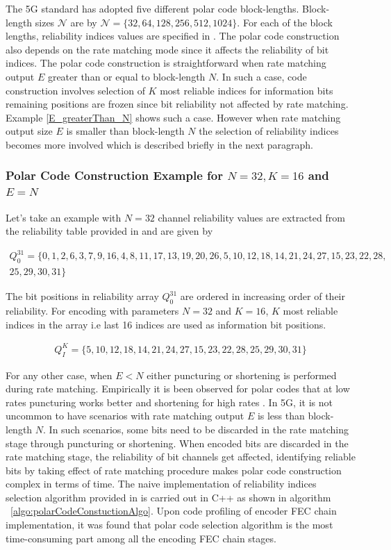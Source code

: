 The 5G standard has adopted five different polar code block-lengths. Block-length sizes $\mathcal{N}$ are by $\mathcal{N} = \{32,64,128,256,512,1024\}$.
For each of the block lengths, reliability indices values are specified in \cite{3gpp.38.212}. The polar code construction also depends on the rate matching mode since it affects the reliability of bit indices. The polar code construction is straightforward when rate matching output $E$ greater than or equal to block-length $N$. In such a case, code construction involves selection of $K$ most reliable indices for information bits remaining positions are frozen since bit reliability not affected by rate matching. Example  \ref{E_greaterThan_N} shows such a case. However when rate matching output size $E$ is smaller than block-length $N$ the selection of reliability indices becomes more involved which is described briefly in the next paragraph.

\subsubsection*{Polar Code Construction Example for $N = 32, K = 16$ and $E = N$} \label{E_greaterThan_N}
Let's take an example with $N = 32$ channel reliability values are extracted from the reliability table provided in \cite{3gpp.38.212} and are given by

\begin{eqnarray*}
Q_{0}^{31} = \{ 0, 1, 2, 6, 3, 7, 9, 16,4, 8, 11, 17, 13, 19, 20, 26, 5, 10, 12, 18, 14, 21, 24, 27, 15, 23, 22, 28,\\
25, 29, 30, 31 \}
\end{eqnarray*}

The bit positions in reliability array $Q_{0}^{31}$ are ordered in increasing order of their reliability. For encoding with parameters $N = 32$ and $K = 16$, $K$ most reliable indices in the array i.e last 16 indices are used as information bit positions. 

\begin{eqnarray*}
	Q_{\textit{I}}^{\textit{K}} =  \{5, 10, 12, 18, 14, 21, 24, 27, 15, 23, 22, 28,25, 29, 30, 31 \}
\end{eqnarray*} 

For any other case, when $E < N$ either puncturing or shortening is performed during rate matching. Empirically it is been observed for polar codes that at low rates puncturing works better and shortening for high rates \cite{lowcomplexityPuncShorteng}. In 5G, it is not uncommon to have scenarios with rate matching output $E$ is less than block-length $N$. In such scenarios, some bits need to be discarded in the rate matching stage through puncturing or shortening. When encoded bits are discarded in the rate matching stage, the reliability of bit channels get affected, identifying reliable bits by taking effect of rate matching procedure makes polar code construction complex in terms of time. The naive implementation of reliability indices selection algorithm provided in \cite{3gpp.38.212} is carried out in C++ as shown in algorithm ~\ref{algo:polarCodeConstuctionAlgo}. Upon code profiling of encoder FEC chain implementation, it was found that polar code selection algorithm is the most time-consuming part among all the encoding FEC chain stages.


